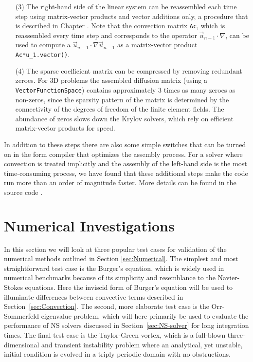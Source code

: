 \begin{itemize}
\item[(3)] The right-hand side of the linear system
can be reassembled each time step using matrix-vector products and
vector additions only, a procedure that is described in
Chapter \cite{Langtangen2010}. Note that the convection matrix {\fontsize{12pt}{12pt}\texttt{Ac}},
which is reassembled every time step and corresponds to the
operator $\vec{u}_{n-1}\cdot\nabla$, can be used to compute a
$\vec{u}_{n-1}\cdot\nabla\vec{u}_{n-1}$ as a matrix-vector
product {\fontsize{12pt}{12pt}\verb!Ac*u_1.vector()!}.

\item[(4)] The sparse coefficient matrix can be compressed by removing
redundant zeroes. For 3D problems the
assembled diffusion matrix (using a {\fontsize{12pt}{12pt}\texttt{VectorFunctionSpace}})
contains approximately 3 times as many zeroes as non-zeros, since
the sparsity pattern of the matrix is determined by the connectivity of
the degrees of freedom of the finite element fields. The
abundance of zeros slows down the Krylov solvers, which rely on
efficient matrix-vector products for speed.

\end{itemize}
In addition to these steps there are also some simple switches that
can be turned on in the form compiler that optimizes the assembly
process. For a solver where convection is treated implicitly and the
assembly of the left-hand side is the most time-consuming process, we
have found that these additional steps make the code run more than an
order of magnitude faster. More details can be found in the source
code \cite{MortensenMardal2010}.

\section{Numerical Investigations}
\label{sec:testcases}
In this section we will look at three popular test cases for validation of the numerical methods outlined in Section \ref{sec:Numerical}. The simplest and most straightforward test case is the Burger's equation, which is widely used in numerical benchmarks because of its simplicity and resemblance to the Navier-Stokes equations. Here the inviscid form of Burger's equation will be used to illuminate differences between convective terms described in Section~\ref{sec:Convection}. The second, more elaborate test case is the Orr-Sommerfeld eigenvalue problem, which will here primarily be used to evaluate the performance of NS solvers discussed in Section~\ref{sec:NS-solver} for long integration times. The final test case is the Taylor-Green vortex, which is a full-blown three-dimensional and transient instability problem where an analytical, yet unstable, initial condition is evolved in a triply periodic domain with no obstructions.

